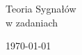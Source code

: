 \thispagestyle{empty}
\begin{titlepage}
  \begin{center}
    
    \baselineskip=100pt
    {\fontsize{100}{120}\selectfont  Teoria Sygnałów} \\ {\fontsize{80}{100}\selectfont w zadaniach}
    \\[10em]
    \bookauthors
    
    \vfill
    
    {\large \today }
    
  \end{center}
\end{titlepage}
\cleardoublepage
